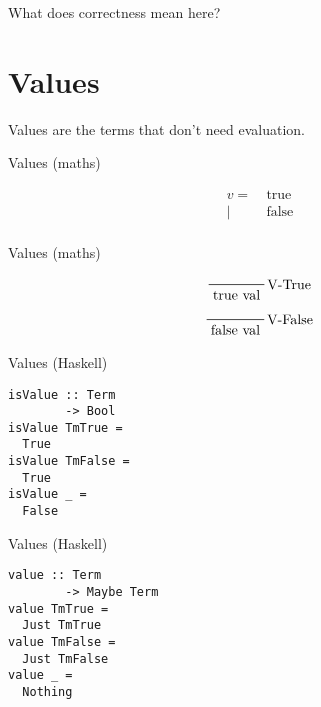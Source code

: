 \documentclass{beamer}
\begin{document}
\begin{frame}[c]
  \begin{center}
What does correctness mean here?
  \end{center}
\end{frame}

\section{Values}

\begin{frame}[c]
  \begin{center}
   Values are the terms that don't need evaluation. 
  \end{center}
\end{frame}

\begin{frame}[c]
  \begin{center}
Values (maths)
  \end{center}
  \begin{displaymath}
    \begin{aligned}
v =& \ \text{true} \\
  |& \ \text{false}  \\
    \end{aligned}
  \end{displaymath}
\end{frame}

\begin{frame}[c]
  \begin{center}
Values (maths)
  \end{center}
  \begin{displaymath}
    \prftree[r]{V-True}{\text{true val}}
  \end{displaymath}
  \begin{displaymath}
    \prftree[r]{V-False}{\text{false val}}
  \end{displaymath}
\end{frame}

\begin{frame}[fragile]
  \begin{center}
Values (Haskell)
  \end{center}
 \begin{verbatim}
isValue :: Term 
        -> Bool
isValue TmTrue = 
  True
isValue TmFalse = 
  True
isValue _ = 
  False
 \end{verbatim}
\end{frame}

\begin{frame}[fragile]
  \begin{center}
Values (Haskell)
  \end{center}
 \begin{verbatim}
value :: Term 
        -> Maybe Term
value TmTrue = 
  Just TmTrue
value TmFalse = 
  Just TmFalse
value _ = 
  Nothing
 \end{verbatim}
\end{frame}
\end{document}
